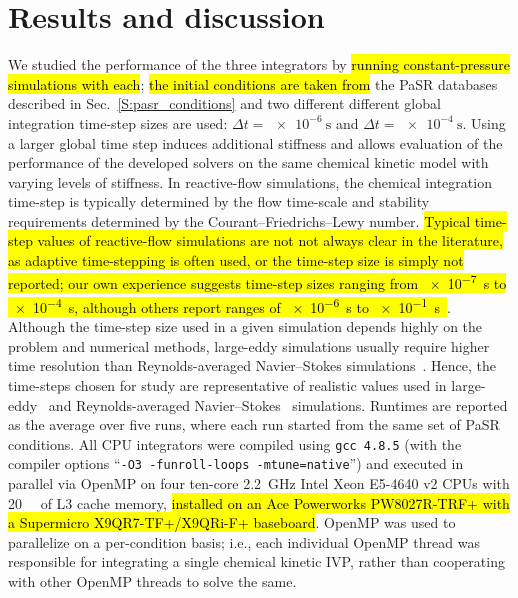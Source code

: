 \documentclass[preprint,review,11pt]{elsarticle}
\DeclareRobustCommand{\hlb}[1]{\sethlcolor{SkyBlue}\hl{#1}}
\DeclareRobustCommand{\hlg}[1]{\sethlcolor{green}\hl{#1}}
\begin{document}
\section{Results and discussion}
\label{S:results}

We studied the performance of the three integrators by \hlg{running constant-pressure simulations with each}; \hlg{the initial conditions are taken from} the PaSR databases described in Sec.~\ref{S:pasr_conditions} and two different different global integration time-step sizes are used: $\Delta t = \SI{e-6}{\s}$ and $\Delta t = \SI{e-4}{\s}$.
Using a larger global time step induces additional stiffness and allows evaluation of the performance of the developed solvers on the same chemical kinetic model with varying levels of stiffness.
In reactive-flow simulations, the chemical integration time-step is typically determined by the flow time-scale and stability requirements determined by the Courant--Friedrichs--Lewy number.
\hlb{Typical time-step values of reactive-flow simulations are not not always clear in the literature, as adaptive time-stepping is often used, or the time-step size is simply not reported; our own experience suggests time-step sizes ranging from {\SI{e-7}{\s}} to {\SI{e-4}{\s}}, although others report ranges of {\SI{e-6}{\s}} to {\SI{e-1}{\s}}~\cite{Yang:2013ip}}.
Although the time-step size used in a given simulation depends highly on the problem and numerical methods, large-eddy simulations usually require higher time resolution than Reynolds-averaged Navier--Stokes simulations~\cite{Iaccarino:2003147}.
Hence, the time-steps chosen for study are representative of realistic values used in large-eddy~\cite{Wang20111319,Bulat20133155} and Reynolds-averaged Navier--Stokes~\cite{Ramirez2010,Galloni20091131} simulations.
Runtimes are reported as the average over five runs, where each run started from the same set of PaSR conditions.
All CPU integrators were compiled using \texttt{gcc 4.8.5} (with the compiler options ``\texttt{-O3 -funroll-loops -mtune=native}'') and executed in parallel via OpenMP on four ten-core \SI{2.2}{\giga\hertz} Intel Xeon E5-4640 v2 CPUs with \SI{20}{\mega\byte} of L3 cache memory, \hlb{installed on an Ace Powerworks PW8027R-TRF+ with a Supermicro X9QR7-TF+/X9QRi-F+ baseboard}.
OpenMP was used to parallelize on a per-condition basis; i.e., each individual OpenMP thread was responsible for integrating a single chemical kinetic IVP, rather than cooperating with other OpenMP threads to solve the same.
\end{document}
